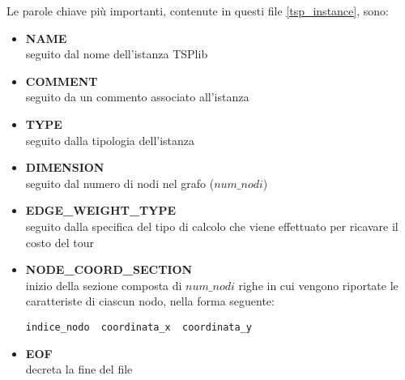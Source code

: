 Le parole chiave più importanti, contenute in questi file \ref{tsp_instance}, sono:
\begin{itemize}
\item{\textbf{NAME}\\
seguito dal nome dell'istanza TSPlib}
\item{\textbf{COMMENT}\\
seguito da un commento associato all'istanza}
\item{\textbf{TYPE}\\
seguito dalla tipologia dell'istanza}
\item{\textbf{DIMENSION}\\
seguito dal numero di nodi nel grafo ($num\_nodi$)}
\item{\textbf{EDGE\_WEIGHT\_TYPE}\\
seguito dalla specifica del tipo di calcolo che viene effettuato per ricavare il costo del tour}
\item{\textbf{NODE\_COORD\_SECTION}\\
inizio della sezione composta di $num\_nodi$ righe in cui vengono riportate le caratteriste di ciascun nodo, nella forma seguente:
\begin{lstlisting}[linewidth=250pt,basicstyle=\footnotesize\sffamily,]     
indice_nodo  coordinata_x  coordinata_y
\end{lstlisting}}
\item{\textbf{EOF}\\
decreta la fine del file}
\end{itemize}